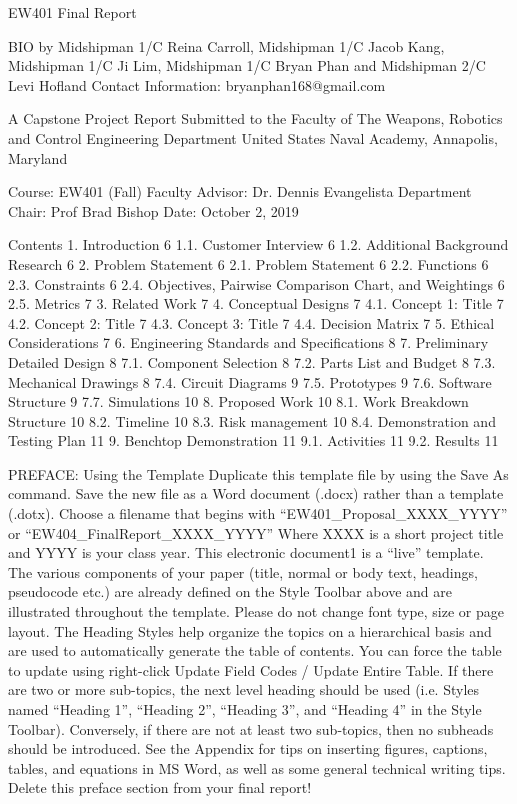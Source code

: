 



EW401 Final Report

BIO
by
Midshipman 1/C Reina Carroll, Midshipman 1/C Jacob Kang,  Midshipman 1/C Ji Lim, Midshipman 1/C Bryan Phan and Midshipman 2/C Levi Hofland
Contact Information: bryanphan168@gmail.com

A Capstone Project Report Submitted to the Faculty of
The Weapons, Robotics and Control Engineering Department
United States Naval Academy, Annapolis, Maryland

Course:  EW401 (Fall) 
Faculty Advisor: Dr. Dennis Evangelista
Department Chair: Prof Brad Bishop
Date: October 2, 2019
 
Contents
1.	Introduction	6
1.1.	Customer Interview	6
1.2.	Additional Background Research	6
2.	Problem Statement	6
2.1.	Problem Statement	6
2.2.	Functions	6
2.3.	Constraints	6
2.4.	Objectives, Pairwise Comparison Chart, and Weightings	6
2.5.	Metrics	7
3.	Related Work	7
4.	Conceptual Designs	7
4.1.	Concept 1:  Title	7
4.2.	Concept 2:  Title	7
4.3.	Concept 3:  Title	7
4.4.	Decision Matrix	7
5.	Ethical Considerations	7
6.	Engineering Standards and Specifications	8
7.	Preliminary Detailed Design	8
7.1.	Component Selection	8
7.2.	Parts List and Budget	8
7.3.	Mechanical Drawings	8
7.4.	Circuit Diagrams	9
7.5.	Prototypes	9
7.6.	Software Structure	9
7.7.	Simulations	10
8.	Proposed Work	10
8.1.	Work Breakdown Structure	10
8.2.	Timeline	10
8.3.	Risk management	10
8.4.	Demonstration and Testing Plan	11
9.	Benchtop Demonstration	11
9.1.	Activities	11
9.2.	Results	11


PREFACE: Using the Template
Duplicate this template file by using the Save As command.  Save the new file as a Word document (.docx) rather than a template (.dotx).  Choose a filename that begins with “EW401_Proposal_XXXX_YYYY” or “EW404_FinalReport_XXXX_YYYY” Where XXXX is a short project title and YYYY is your class year. 
This electronic document1 is a “live” template. The various components of your paper (title, normal or body text, headings, pseudocode etc.) are already defined on the Style Toolbar above and are illustrated throughout the template.  Please do not change font type, size or page layout.   
The Heading Styles help organize the topics on a hierarchical basis and are used to automatically generate the table of contents.  You can force the table to update using right-click Update Field Codes / Update Entire Table. If there are two or more sub-topics, the next level heading should be used (i.e. Styles named “Heading 1”, “Heading 2”, “Heading 3”, and “Heading 4” in the Style Toolbar). Conversely, if there are not at least two sub-topics, then no subheads should be introduced. 
See the Appendix for tips on inserting figures, captions, tables, and equations in MS Word, as well as some general technical writing tips. 
Delete this preface section from your final report! 

